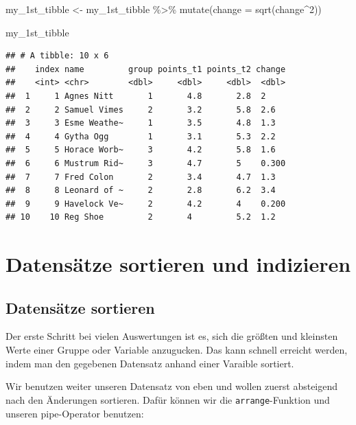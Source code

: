 \documentclass[
]{book}
\newenvironment{Shaded}{\begin{snugshade}}{\end{snugshade}}
\newcommand{\AttributeTok}[1]{\textcolor[rgb]{0.77,0.63,0.00}{#1}}
\newcommand{\DecValTok}[1]{\textcolor[rgb]{0.00,0.00,0.81}{#1}}
\newcommand{\FunctionTok}[1]{\textcolor[rgb]{0.00,0.00,0.00}{#1}}
\newcommand{\NormalTok}[1]{#1}
\newcommand{\OtherTok}[1]{\textcolor[rgb]{0.56,0.35,0.01}{#1}}
\newcommand{\SpecialCharTok}[1]{\textcolor[rgb]{0.00,0.00,0.00}{#1}}
\begin{document}
\begin{Shaded}
\begin{Highlighting}[]
\NormalTok{my\_1st\_tibble }\OtherTok{\textless{}{-}}\NormalTok{ my\_1st\_tibble }\SpecialCharTok{\%\textgreater{}\%} 
  \FunctionTok{mutate}\NormalTok{(}\AttributeTok{change =} \FunctionTok{sqrt}\NormalTok{(change}\SpecialCharTok{\^{}}\DecValTok{2}\NormalTok{))}

\NormalTok{my\_1st\_tibble}
\end{Highlighting}
\end{Shaded}

\begin{verbatim}
## # A tibble: 10 x 6
##    index name         group points_t1 points_t2 change
##    <int> <chr>        <dbl>     <dbl>     <dbl>  <dbl>
##  1     1 Agnes Nitt       1       4.8       2.8  2    
##  2     2 Samuel Vimes     2       3.2       5.8  2.6  
##  3     3 Esme Weathe~     1       3.5       4.8  1.3  
##  4     4 Gytha Ogg        1       3.1       5.3  2.2  
##  5     5 Horace Worb~     3       4.2       5.8  1.6  
##  6     6 Mustrum Rid~     3       4.7       5    0.300
##  7     7 Fred Colon       2       3.4       4.7  1.3  
##  8     8 Leonard of ~     2       2.8       6.2  3.4  
##  9     9 Havelock Ve~     2       4.2       4    0.200
## 10    10 Reg Shoe         2       4         5.2  1.2
\end{verbatim}

\hypertarget{datensuxe4tze-sortieren-und-indizieren}{%
\section{Datensätze sortieren und indizieren}\label{datensuxe4tze-sortieren-und-indizieren}}

\hypertarget{datensuxe4tze-sortieren}{%
\subsection{Datensätze sortieren}\label{datensuxe4tze-sortieren}}

Der erste Schritt bei vielen Auswertungen ist es, sich die größten und kleinsten Werte einer Gruppe oder Variable anzugucken. Das kann schnell erreicht werden, indem man den gegebenen Datensatz anhand einer Varaible sortiert.

Wir benutzen weiter unseren Datensatz von eben und wollen zuerst absteigend nach den Änderungen sortieren.
Dafür können wir die \texttt{arrange}-Funktion und unseren pipe-Operator benutzen:
\end{document}

